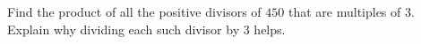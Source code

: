 Find the product of all the positive divisors of $450$ that are multiples of $3$. Explain why dividing each such divisor by $3$ helps.
